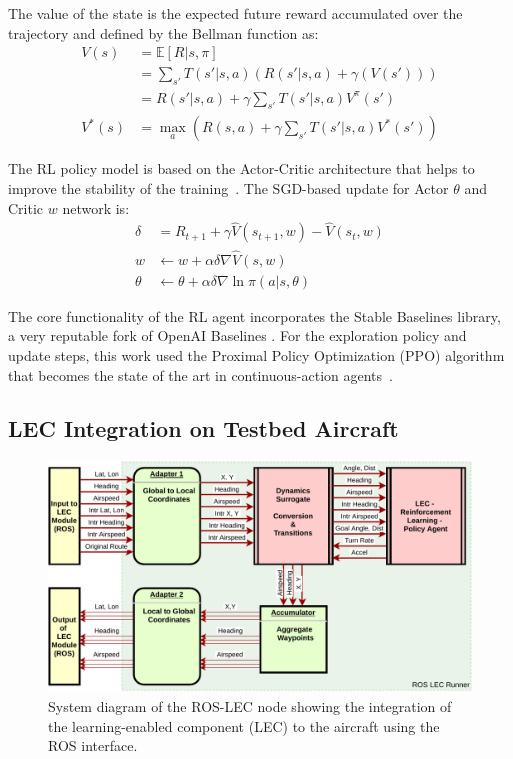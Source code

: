 The value of the state is the expected future reward accumulated over the trajectory and defined by the Bellman function as:
\begin{align}
	V(s) &=  \mathbb{E} [R | s, \pi] \\
	&= \sum_{s'} T(s'|s,a) \left( R(s'|s,a) + \gamma ( V(s')) \right) \\
	&=  R(s'|s,a) + \gamma \sum_{s'} T(s'|s,a) V^{\pi}(s') \\
	V^{*}(s) &= \max_{a} \left( R(s,a) + \gamma \sum_{s'} T(s'|s,a) V^{*}(s') \right)
\end{align}

The RL policy model is based on the Actor-Critic architecture that helps to improve the stability of the training~\cite{sutton2018reinforcement}. The SGD-based update for Actor $\theta$ and Critic $w$ network is:
\begin{align}
	\delta &=  R_{t+1} +\gamma \hat V(s_{t+1},w) - \hat V(s_t,w) \\
	w &\leftarrow w + \alpha \delta \nabla \hat V (s, w) \\
	\theta &\leftarrow \theta + \alpha \delta \nabla \ln \pi (a|s, \theta)
\end{align} 

The core functionality of the RL agent incorporates the Stable Baselines library, a very reputable fork of OpenAI Baselines \cite{hill2018stable}. For the exploration policy and update steps, this work used the Proximal Policy Optimization (PPO) algorithm that becomes the state of the art in continuous-action agents~\cite{schulman2017proximal}.


\subsection{LEC Integration on Testbed Aircraft}

\begin{figure}[h]
	\centering
	\includegraphics[width=\linewidth]{figures/cp25_ros.pdf}
	\caption{System diagram of the ROS-LEC node showing the integration of the learning-enabled component (LEC) to the aircraft using the ROS interface.}
	\label{fig:integration}
\end{figure}


